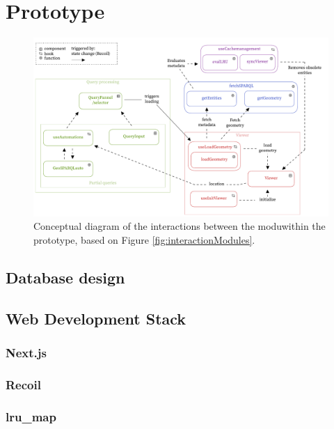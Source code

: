 \chapter{Prototype} \label{ch:prototype}

\begin{figure}[H]
    \centering
    \includegraphics[width=\textwidth]{figures/pdf/interactions_prototype.pdf}
    \caption[Interactions prototype]{Conceptual diagram of the interactions between the moduwithin the prototype, based on Figure \ref{fig:interactionModules}.}
    \label{fig:interactionPrototype}
\end{figure}

\section{Database design}

\section{Web Development Stack}
\subsection{Next.js}

\subsection{Recoil}

\subsection{lru\_map}

